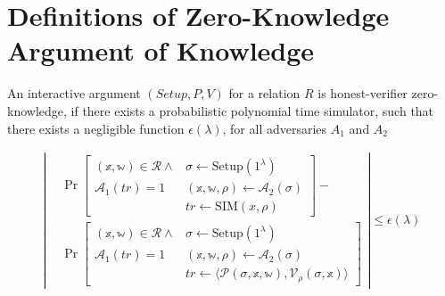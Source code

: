 
\section{Definitions of Zero-Knowledge Argument of Knowledge}\label{sec:appendix}
\begin{definition}
    An interactive argument $(Setup, P, V)$ for a relation $R$ is honest-verifier zero-knowledge, if there exists a
    probabilistic polynomial time simulator, such that there exists a negligible function $\epsilon(\lambda)$, for all adversaries $A_1$ and $A_2$

    \begin{align*}
        \left| %
        \begin{aligned} %
            & \Pr \left[ %
                \begin{array}{c|l}
                (\mathbb{x},\mathbb{w}) \in \mathcal{R} \land & \sigma \leftarrow \text{Setup}(1^\lambda) \\
                \mathcal{A}_1(tr) = 1 & (\mathbb{x},\mathbb{w},\rho) \leftarrow \mathcal{A}_2(\sigma) \\
                & tr \leftarrow \text{SIM}(x,\rho)
                \end{array}
                \right] - \\ %
            & \Pr \left[ %
                \begin{array}{c|l}
                (\mathbb{x},\mathbb{w}) \in \mathcal{R} \land & \sigma \leftarrow \text{Setup}(1^\lambda) \\
                \mathcal{A}_1(tr) = 1 & (\mathbb{x},\mathbb{w},\rho) \leftarrow \mathcal{A}_2(\sigma) \\
                & tr \leftarrow \langle \mathcal{P}(\sigma,\mathbb{x},\mathbb{w}), \mathcal{V}_\rho(\sigma,\mathbb{x}) \rangle
                \end{array}
                \right]
        \end{aligned}
        \right| %
        \leq \epsilon(\lambda)
    \end{align*}
\end{definition}


